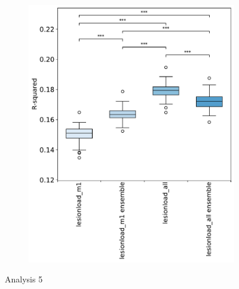 \documentclass[10pt]{article}
\begin{document}
\begin{figure}
\begin{subfigure}{0.5\textwidth}
  \includegraphics[width=1\linewidth]{figures/analysis_5_boxplots_rsquared.pdf}
  \caption{}
  \label{fig:sfig1}
\end{subfigure}
\caption{Analysis 5}
\label{fig:fig}
\end{figure}
\end{document}
